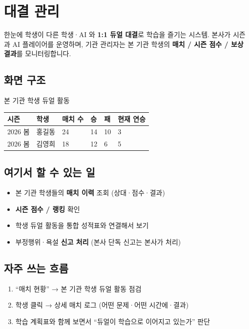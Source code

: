 \chapter{대결 관리}

\begin{summarybox}{한눈에}
학생이 다른 학생·AI 와 \textbf{1:1 듀얼 대결}로 학습을 즐기는 시스템. 본사가 시즌과 AI 플레이어를 운영하며, 기관 관리자는 본 기관 학생의 \textbf{매치 / 시즌 점수 / 보상 결과}를 모니터링합니다.
\end{summarybox}


\section*{화면 구조}


\begin{screenbox}{본 기관 학생 듀얼 활동}
\noindent
\begin{tabular}{@{}p{2cm}p{2.5cm}p{2cm}p{2cm}p{2cm}p{2cm}@{}}
\toprule
\textbf{시즌} & \textbf{학생} & \textbf{매치 수} & \textbf{승} & \textbf{패} & \textbf{현재 연승} \\
\midrule
2026 봄 & 홍길동 & 24 & 14 & 10 & 3 \\
2026 봄 & 김영희 & 18 & 12 & 6 & 5 \\
\bottomrule
\end{tabular}
\end{screenbox}

\section*{여기서 할 수 있는 일}
\begin{itemize}[leftmargin=1.2em]
  \item 본 기관 학생들의 \textbf{매치 이력} 조회 (상대·점수·결과)
  \item \textbf{시즌 점수 / 랭킹} 확인
  \item 학생 듀얼 활동을 통합 성적표와 연결해서 보기
  \item 부정행위·욕설 \textbf{신고 처리} (본사 단독 신고는 본사가 처리)
\end{itemize}

\section*{자주 쓰는 흐름}
\begin{enumerate}
  \item ``매치 현황'' → 본 기관 학생 듀얼 활동 점검
  \item 학생 클릭 → 상세 매치 로그 (어떤 문제·어떤 시간에·결과)
  \item 학습 계획표와 함께 보면서 ``듀얼이 학습으로 이어지고 있는가'' 판단
\end{enumerate}

